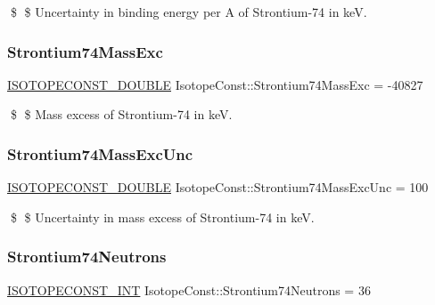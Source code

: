 \$ \$ Uncertainty in binding energy per A of Strontium-\/74 in keV. \mbox{\label{group___isotope_const-_strontium-_sr74_ga815052d520c2603a3f8d7b4da5f5d6f4}} 
\subsubsection{\texorpdfstring{Strontium74\+Mass\+Exc}{Strontium74MassExc}}
{\footnotesize\ttfamily \mbox{\hyperlink{group___isotope_const-_macros_ga8f45a7272ce02c0b4c65c44636ed719a}{I\+S\+O\+T\+O\+P\+E\+C\+O\+N\+S\+T\+\_\+\+D\+O\+U\+B\+LE}} Isotope\+Const\+::\+Strontium74\+Mass\+Exc = -\/40827}

\$ \$ Mass excess of Strontium-\/74 in keV. \mbox{\label{group___isotope_const-_strontium-_sr74_gabc54228d5fbd2603fac35c43a126a9a8}} 
\subsubsection{\texorpdfstring{Strontium74\+Mass\+Exc\+Unc}{Strontium74MassExcUnc}}
{\footnotesize\ttfamily \mbox{\hyperlink{group___isotope_const-_macros_ga8f45a7272ce02c0b4c65c44636ed719a}{I\+S\+O\+T\+O\+P\+E\+C\+O\+N\+S\+T\+\_\+\+D\+O\+U\+B\+LE}} Isotope\+Const\+::\+Strontium74\+Mass\+Exc\+Unc = 100}

\$ \$ Uncertainty in mass excess of Strontium-\/74 in keV. \mbox{\label{group___isotope_const-_strontium-_sr74_ga920c840f554ac2e2addc42ff64d87c98}} 
\subsubsection{\texorpdfstring{Strontium74\+Neutrons}{Strontium74Neutrons}}
{\footnotesize\ttfamily \mbox{\hyperlink{group___isotope_const-_macros_ga5f18360b3e99483a35c32d789e62621c}{I\+S\+O\+T\+O\+P\+E\+C\+O\+N\+S\+T\+\_\+\+I\+NT}} Isotope\+Const\+::\+Strontium74\+Neutrons = 36}

